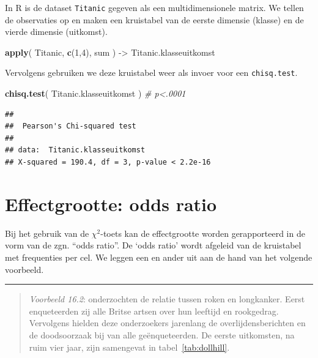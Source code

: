 \documentclass[
]{book}
\newenvironment{Shaded}{\begin{snugshade}}{\end{snugshade}}
\newcommand{\CommentTok}[1]{\textcolor[rgb]{0.56,0.35,0.01}{\textit{#1}}}
\newcommand{\DecValTok}[1]{\textcolor[rgb]{0.00,0.00,0.81}{#1}}
\newcommand{\KeywordTok}[1]{\textcolor[rgb]{0.13,0.29,0.53}{\textbf{#1}}}
\newcommand{\NormalTok}[1]{#1}
\newcommand{\StringTok}[1]{\textcolor[rgb]{0.31,0.60,0.02}{#1}}
\begin{document}
In R is de dataset \texttt{Titanic} gegeven als een multidimensionele matrix. We tellen de observaties op en maken een kruistabel van de eerste dimensie (klasse) en de vierde dimensie (uitkomst).

\begin{Shaded}
\begin{Highlighting}[]
\KeywordTok{apply}\NormalTok{( Titanic, }\KeywordTok{c}\NormalTok{(}\DecValTok{1}\NormalTok{,}\DecValTok{4}\NormalTok{), sum ) {-}\textgreater{}}\StringTok{ }\NormalTok{Titanic.klasseuitkomst}
\end{Highlighting}
\end{Shaded}

Vervolgens gebruiken we deze kruistabel weer als invoer voor een \texttt{chisq.test}.

\begin{Shaded}
\begin{Highlighting}[]
\KeywordTok{chisq.test}\NormalTok{( Titanic.klasseuitkomst )  }\CommentTok{\# p\textless{}.0001}
\end{Highlighting}
\end{Shaded}

\begin{verbatim}
## 
##  Pearson's Chi-squared test
## 
## data:  Titanic.klasseuitkomst
## X-squared = 190.4, df = 3, p-value < 2.2e-16
\end{verbatim}

\hypertarget{effectgrootte-odds-ratio}{%
\section{Effectgrootte: odds ratio}\label{effectgrootte-odds-ratio}}

Bij het gebruik van de \(\chi^2\)-toets kan de effectgrootte worden gerapporteerd in de
vorm van de zgn. ``odds ratio''. De `odds ratio' wordt afgeleid van de
kruistabel met frequenties per cel. We leggen een en ander uit aan de
hand van het volgende voorbeeld.

\begin{center}\rule{0.5\linewidth}{0.5pt}\end{center}

\begin{quote}
\emph{Voorbeeld 16.2}:
\citet{DollHill1956} onderzochten de relatie tussen roken en
longkanker. Eerst enqueteerden zij alle Britse artsen over hun leeftijd
en rookgedrag. Vervolgens hielden deze onderzoekers jarenlang de
overlijdensberichten en de doodsoorzaak bij van alle geënqueteerden. De
eerste uitkomsten, na ruim vier jaar, zijn samengevat in
tabel~\ref{tab:dollhill}.
\end{quote}
\end{document}
